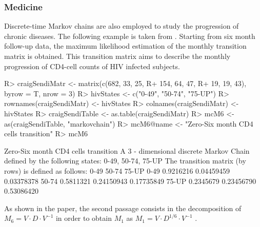 \documentclass[
  nojss]{jss}
\begin{document}
\hypertarget{sec:medicine}{%
\subsubsection{Medicine}\label{sec:medicine}}

Discrete-time Markov chains are also employed to study the progression of chronic diseases. The following example is taken from \cite{craigSendi}. Starting from six month follow-up data, the maximum likelihood estimation of the monthly transition matrix is obtained. This transition matrix aims to describe the monthly progression of CD4-cell counts of HIV infected subjects.

\begin{CodeChunk}

\begin{CodeInput}
R> craigSendiMatr <- matrix(c(682, 33, 25,
R+               154, 64, 47,
R+               19, 19, 43), byrow = T, nrow = 3)
R> hivStates <- c("0-49", "50-74", "75-UP")
R> rownames(craigSendiMatr) <- hivStates
R> colnames(craigSendiMatr) <- hivStates
R> craigSendiTable <- as.table(craigSendiMatr)
R> mcM6 <- as(craigSendiTable, "markovchain")
R> mcM6@name <- "Zero-Six month CD4 cells transition"
R> mcM6
\end{CodeInput}

\begin{CodeOutput}
Zero-Six month CD4 cells transition 
 A  3 - dimensional discrete Markov Chain defined by the following states: 
 0-49, 50-74, 75-UP 
 The transition matrix  (by rows)  is defined as follows: 
           0-49      50-74      75-UP
0-49  0.9216216 0.04459459 0.03378378
50-74 0.5811321 0.24150943 0.17735849
75-UP 0.2345679 0.23456790 0.53086420
\end{CodeOutput}
\end{CodeChunk}

As shown in the paper, the second passage consists in the decomposition of \(M_{6}=V \cdot D \cdot V^{-1}\) in order to obtain \(M_{1}\) as \(M_{1}=V \cdot D^{1/6} \cdot V^{-1}\) .

\begin{CodeChunk}

\end{CodeChunk}
\end{document}
